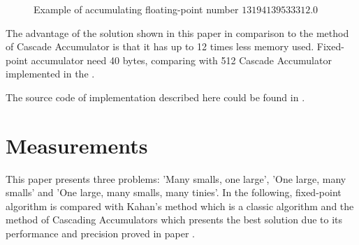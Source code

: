 \documentclass[conference]{IEEEtran}
\begin{document}
\begin{figure}[!t]
	
	\caption{Example of accumulating floating-point number $13194139533312.0$}
	\label{fig:fix_acc_example}
\end{figure}

\par
The advantage of the solution shown in this paper in comparison to the method of Cascade Accumulator 
is that it has up to 12 times less memory used.
Fixed-point accumulator need 40 bytes, 
comparing with 512 Cascade Accumulator implemented in the \cite{ComparisonOfMethods}.
\par
The source code of implementation described here could be found in \cite{FixAccGitHub}.


\section{Measurements}
This paper presents three problems: 'Many smalls, one large',
'One large, many smalls' and 'One large, many smalls, many tinies'.
In the following, fixed-point algorithm is compared with Kahan's method
which is a classic algorithm and the method of Cascading Accumulators 
which presents the best solution due to its performance and precision 
proved in paper \cite{CascadingAccumulators}.
\end{document}
